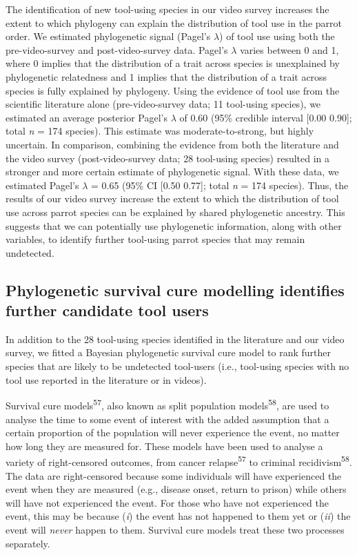 \documentclass[
  man, donotrepeattitle,floatsintext]{apa6}
\begin{document}
The identification of new tool-using species in our video survey increases the
extent to which phylogeny can explain the distribution of tool use in the parrot
order. We estimated phylogenetic signal (Pagel's \(\lambda\)) of tool use using
both the pre-video-survey and post-video-survey data. Pagel's \(\lambda\) varies
between 0 and 1, where 0 implies that the distribution of a trait across species
is unexplained by phylogenetic relatedness and 1 implies that the distribution
of a trait across species is fully explained by phylogeny. Using the evidence of
tool use from the scientific literature alone (pre-video-survey data; 11
tool-using species), we estimated an average posterior Pagel's \(\lambda\) of
0.60 (95\% credible interval {[}0.00
0.90{]}; total \emph{n} =
174 species). This estimate was moderate-to-strong, but highly
uncertain. In comparison, combining the evidence from both the literature and
the video survey (post-video-survey data; 28 tool-using species) resulted in a
stronger and more certain estimate of phylogenetic signal. With these data, we
estimated Pagel's \(\lambda\) = 0.65 (95\% CI
{[}0.50
0.77{]}; total \emph{n} =
174 species). Thus, the results of our video survey increase
the extent to which the distribution of tool use across parrot species can be
explained by shared phylogenetic ancestry. This suggests that we can potentially
use phylogenetic information, along with other variables, to identify further
tool-using parrot species that may remain undetected.

\hypertarget{phylogenetic-survival-cure-modelling-identifies-further-candidate-tool-users}{%
\subsection{Phylogenetic survival cure modelling identifies further candidate tool users}\label{phylogenetic-survival-cure-modelling-identifies-further-candidate-tool-users}}

In addition to the 28 tool-using species identified in the literature and our
video survey, we fitted a Bayesian phylogenetic survival cure model to rank
further species that are likely to be undetected tool-users (i.e., tool-using
species with no tool use reported in the literature or in videos).

Survival cure models\textsuperscript{57}, also known as split population
models\textsuperscript{58}, are used to analyse the time to some event of interest
with the added assumption that a certain proportion of the population will never
experience the event, no matter how long they are measured for. These models
have been used to analyse a variety of right-censored outcomes, from cancer
relapse\textsuperscript{57} to criminal recidivism\textsuperscript{58}. The data are
right-censored because some individuals will have experienced the event when
they are measured (e.g., disease onset, return to prison) while others will have
not experienced the event. For those who have not experienced the event, this
may be because (\emph{i}) the event has not happened to them yet or (\emph{ii}) the event
will \emph{never} happen to them. Survival cure models treat these two processes
separately.
\end{document}
